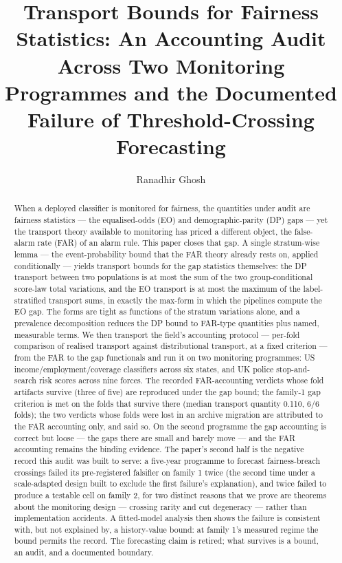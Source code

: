 \documentclass[11pt]{article}
\title{Transport Bounds for Fairness Statistics: An Accounting Audit
Across Two Monitoring Programmes and the Documented Failure of
Threshold-Crossing Forecasting}
\author{Ranadhir Ghosh}
\date{}
\begin{document}
\maketitle

\begin{abstract}
When a deployed classifier is monitored for fairness, the quantities
under audit are fairness statistics --- the equalised-odds (EO) and
demographic-parity (DP) gaps --- yet the transport theory available
to monitoring has priced a different object, the false-alarm rate
(FAR) of an alarm rule. This paper closes that gap. A single
stratum-wise lemma --- the event-probability bound that the FAR
theory already rests on, applied conditionally --- yields transport
bounds for the gap statistics themselves: the DP transport between
two populations is at most the sum of the two group-conditional
score-law total variations, and the EO transport is at most the
maximum of the label-stratified transport sums, in exactly the
max-form in which the pipelines compute the EO gap. The forms are
tight as functions of the stratum variations alone, and a prevalence
decomposition reduces the DP bound to FAR-type quantities plus named,
measurable terms. We then transport the field's accounting protocol
--- per-fold comparison of realised transport against distributional
transport, at a fixed criterion --- from the FAR to the gap
functionals and run it on two monitoring programmes: US
income/employment/coverage classifiers across six states, and UK
police stop-and-search risk scores across nine forces. The recorded
FAR-accounting verdicts whose fold artifacts survive (three of five)
are reproduced under the gap bound; the family-1 gap criterion is
met on the folds that survive there (median transport quantity
0.110, 6/6 folds); the two verdicts whose folds were lost in an
archive migration are attributed to the FAR accounting only, and
said so. On the second programme the gap accounting is correct but
loose --- the gaps there are small and barely move --- and the FAR
accounting remains the binding evidence. The paper's second half is
the negative record this audit was built to serve: a five-year
programme to forecast fairness-breach crossings failed its
pre-registered falsifier on family 1 twice (the second time under a
scale-adapted design built to exclude the first failure's
explanation), and twice failed to produce a testable cell on family
2, for two distinct reasons that we prove are theorems about the
monitoring design --- crossing rarity and cut degeneracy --- rather
than implementation accidents. A fitted-model analysis then shows
the failure is consistent with, but not explained by, a
history-value bound: at family 1's measured regime the bound
permits the record. The forecasting claim is retired; what survives
is a bound, an audit, and a documented boundary.
\end{abstract}
\end{document}
